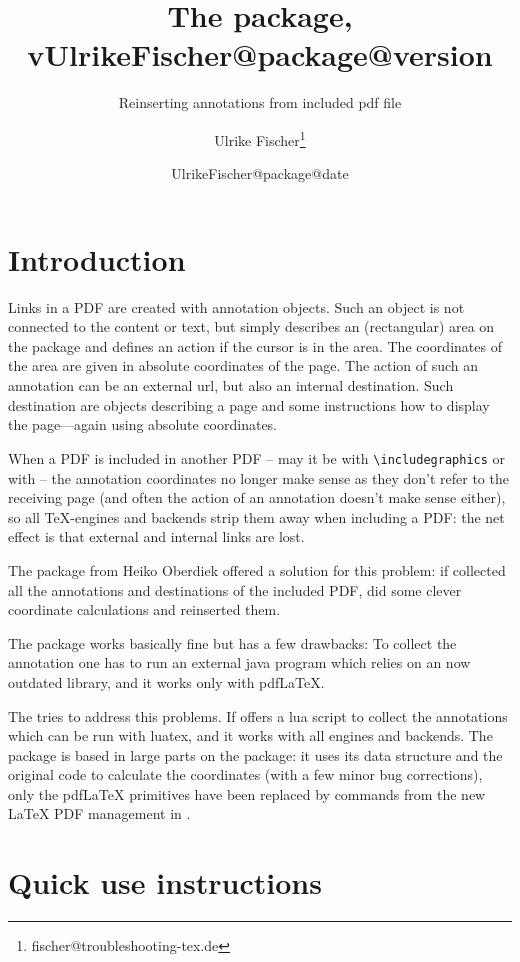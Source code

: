 \documentclass[DIV=12,parskip=half-,bibliography=totoc]{scrartcl}
\title{The \pkg{newpax} package, v\csname UlrikeFischer@package@version\endcsname}
\subtitle{Reinserting annotations from included pdf file}
\date{\csname UlrikeFischer@package@date\endcsname}
\author{Ulrike Fischer\thanks{fischer@troubleshooting-tex.de}}
\begin{document}
\maketitle

\section{Introduction}

Links in a PDF are created with annotation objects. Such an object is not connected to the content
or text, but simply describes an (rectangular) area on the package and defines an action if the 
cursor is in the area. The coordinates of the area are given in absolute coordinates of the page.
The action of such an annotation can be an external url, but also an internal destination. Such destination are objects describing a page and some instructions how to display the page---again using absolute coordinates.

When a PDF is included in another PDF -- may it be with \verb+\includegraphics+ or with \verb++ -- 
the annotation coordinates no longer make sense as they don't refer to the receiving page (and often the action of an annotation doesn't make sense either), so all TeX-engines and backends strip them away when including a PDF: the net effect is that external and internal links are lost.

The  package from Heiko Oberdiek offered a solution for this problem: if collected all the annotations
and destinations of the included PDF, did some clever coordinate calculations and reinserted them.

The package works basically fine but has a few drawbacks: To collect the annotation one has to run an external java program which relies on an now outdated library, and it works only with pdf\LaTeX{}.

The  tries to address this problems. If offers a lua script to collect the annotations which can be run with luatex, and it works with all engines and backends. The package is based in large parts on the  package: it uses its data structure and the original code to calculate the coordinates (with a few minor bug corrections), only the pdf\LaTeX{} primitives have been replaced by commands from the new \LaTeX{} PDF management in .   


\section{Quick use instructions}
\end{document}
